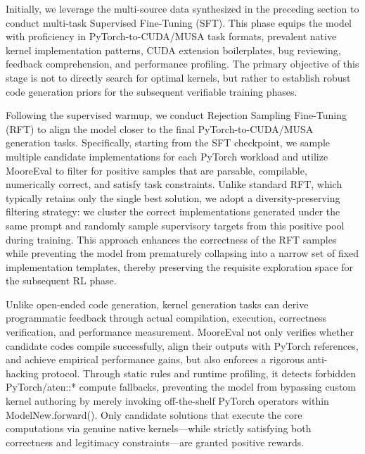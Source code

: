 \documentclass[
  10
]{article}
\begin{document}
Initially, we leverage the multi-source data synthesized in the
preceding section to conduct multi-task Supervised Fine-Tuning (SFT).
This phase equips the model with proficiency in PyTorch-to-CUDA/MUSA
task formats, prevalent native kernel implementation patterns, CUDA
extension boilerplates, bug reviewing, feedback comprehension, and
performance profiling. The primary objective of this stage is not to
directly search for optimal kernels, but rather to establish robust code
generation priors for the subsequent verifiable training phases.

Following the supervised warmup, we conduct Rejection Sampling
Fine-Tuning (RFT) to align the model closer to the final
PyTorch-to-CUDA/MUSA generation tasks. Specifically, starting from the
SFT checkpoint, we sample multiple candidate implementations for each
PyTorch workload and utilize MooreEval to filter for positive samples
that are parsable, compilable, numerically correct, and satisfy task
constraints. Unlike standard RFT, which typically retains only the
single best solution, we adopt a diversity-preserving filtering
strategy: we cluster the correct implementations generated under the
same prompt and randomly sample supervisory targets from this positive
pool during training. This approach enhances the correctness of the RFT
samples while preventing the model from prematurely collapsing into a
narrow set of fixed implementation templates, thereby preserving the
requisite exploration space for the subsequent RL phase.

Unlike open-ended code generation, kernel generation tasks can derive
programmatic feedback through actual compilation, execution, correctness
verification, and performance measurement. MooreEval not only verifies
whether candidate codes compile successfully, align their outputs with
PyTorch references, and achieve empirical performance gains, but also
enforces a rigorous anti-hacking protocol. Through static rules and
runtime profiling, it detects forbidden PyTorch/aten::* compute
fallbacks, preventing the model from bypassing custom kernel authoring
by merely invoking off-the-shelf PyTorch operators within
ModelNew.forward(). Only candidate solutions that execute the core
computations via genuine native kernels---while strictly satisfying both
correctness and legitimacy constraints---are granted positive rewards.
\end{document}
